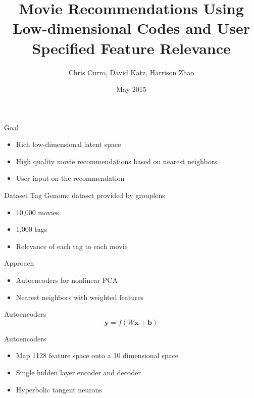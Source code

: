 \documentclass{beamer}
\title{Movie Recommendations Using Low-dimensional Codes and User Specified Feature Relevance}
\author{Chris Curro, David Katz, Harrison Zhao}
\date{May 2015}
\begin{document}
\begin{frame}
\titlepage
\end{frame}

\begin{frame}{Goal}
\begin{itemize}
\item Rich low-dimensional latent space
\item High quality movie recommendations based on nearest neighbors
\item User input on the recommendation
\end{itemize}
\end{frame}

\begin{frame}{Dataset}
Tag Genome dataset provided by grouplens
\begin{itemize}
\item 10,000 movies
\item 1,000 tags
\item Relevance of each tag to each movie
\end{itemize}
\end{frame}

\begin{frame}{Approach}
\begin{itemize}
\item Autoencoders for nonlinear PCA
\item Nearest neighbors with weighted features
\end{itemize}
\end{frame}

\begin{frame}{Autoencoders}
\begin{equation}
\mathbf{y} = f\left(W\mathbf{x} + \mathbf{b}\right)
\end{equation}
\begin{center}

\end{center}
\end{frame}

\begin{frame}{Autoencoders}
\begin{itemize}
\item Map 1128 feature space onto a 10 dimensional space
\item Single hidden layer encoder and decoder
\item Hyperbolic tangent neurons
\end{itemize}
\end{frame}
\end{document}
